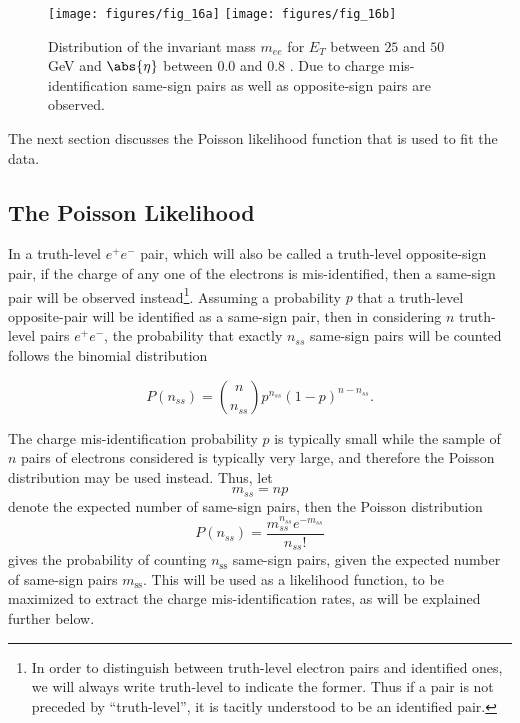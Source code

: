 \begin{figure}[H]
	\texttt{[image: figures/fig\_16a]}
	\texttt{[image: figures/fig\_16b]}
	\centering

	\caption{Distribution of the invariant mass $m_{ee}$ for $E_T$ between $25$
		and $50$ GeV and $\abs{\eta} $ between $0.0$ and $0.8$ \cite{atlaselcid}. Due
		to charge mis-identification same-sign pairs as well as opposite-sign pairs
		are observed.}

	\label{f:meea}

\end{figure}

The next section discusses the Poisson likelihood function that is used to
fit the data.


\subsection{The Poisson Likelihood}\label{s:cpllh}

In a truth-level $e^+e^-$ pair, which will also be called a truth-level
opposite-sign pair, if the charge of any one of the electrons is
mis-identified, then a same-sign pair will be observed instead\footnote{ In
	order to distinguish between truth-level electron pairs and identified ones, we
	will always write truth-level to indicate the former. Thus if a pair is not
	preceded by ``truth-level'', it is tacitly understood to be an identified pair. }.
Assuming a probability $p$ that a truth-level opposite-pair will be identified
as a same-sign pair, then in considering $n$ truth-level pairs $e^+e^-$, the
probability that exactly $n_{ss}$ same-sign pairs will be counted follows the
binomial distribution

$$
	P(n_{ss}) = \binom{n}{n_{ss}}p^{n_{ss}}(1-p)^{n-n_{ss}}.
$$

The charge mis-identification probability $p$ is typically small while the
sample of $n$ pairs of electrons considered is typically very large, and
therefore the Poisson distribution may be used instead. Thus, let
\begin{equation}\label{eq:cmss}
	m_{ss} = np
\end{equation}
denote the expected number of same-sign pairs, then the Poisson distribution
\begin{equation}\label{eq:cpoissonn}
	P(n_{ss}) = \frac{m_{ss}^{n_{ss}} e^{-m_{ss}}}{n_{ss}!}
\end{equation}
gives the probability of counting $n_{\text{ss}}$ same-sign pairs, given the
expected number of same-sign pairs $m_{\text{ss}}$. This will be used as
a likelihood function, to be maximized to extract the charge mis-identification
rates, as will be explained further below.

